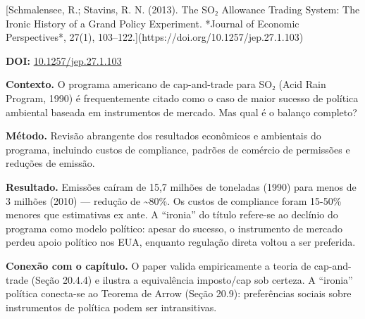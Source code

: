 \documentclass[11pt,twoside,openright]{book}
\begin{document}
\begin{pesquisabox}{[Schmalensee, R.; Stavins, R. N. (2013). The SO₂ Allowance Trading System: The Ironic History of a Grand Policy Experiment. *Journal of Economic Perspectives*, 27(1), 103–122.](https://doi.org/10.1257/jep.27.1.103)}

\textbf{DOI:}
\href{https://doi.org/10.1257/jep.27.1.103}{10.1257/jep.27.1.103}

\textbf{Contexto.} O programa americano de cap-and-trade para SO₂ (Acid
Rain Program, 1990) é frequentemente citado como o caso de maior sucesso
de política ambiental baseada em instrumentos de mercado. Mas qual é o
balanço completo?

\textbf{Método.} Revisão abrangente dos resultados econômicos e
ambientais do programa, incluindo custos de compliance, padrões de
comércio de permissões e reduções de emissão.

\textbf{Resultado.} Emissões caíram de 15,7 milhões de toneladas (1990)
para menos de 3 milhões (2010) --- redução de \textasciitilde80\%. Os
custos de compliance foram 15-50\% menores que estimativas ex ante. A
``ironia'' do título refere-se ao declínio do programa como modelo
político: apesar do sucesso, o instrumento de mercado perdeu apoio
político nos EUA, enquanto regulação direta voltou a ser preferida.

\textbf{Conexão com o capítulo.} O paper valida empiricamente a teoria
de cap-and-trade (Seção 20.4.4) e ilustra a equivalência imposto/cap sob
certeza. A ``ironia'' política conecta-se ao Teorema de Arrow (Seção
20.9): preferências sociais sobre instrumentos de política podem ser
intransitivas.

\end{pesquisabox}
\end{document}
